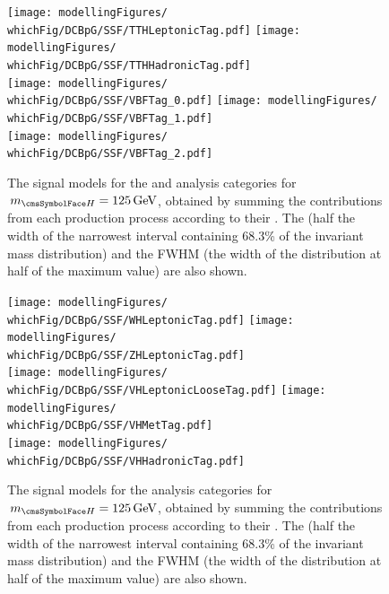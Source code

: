 \begin{figure}[htp!]
\centering
\texttt{[image: modellingFigures/\\whichFig/DCBpG/SSF/TTHLeptonicTag.pdf]} 
\texttt{[image: modellingFigures/\\whichFig/DCBpG/SSF/TTHHadronicTag.pdf]} \\
\texttt{[image: modellingFigures/\\whichFig/DCBpG/SSF/VBFTag\_0.pdf]} 
\texttt{[image: modellingFigures/\\whichFig/DCBpG/SSF/VBFTag\_1.pdf]}\\ 
\ifNewAnalysis
\texttt{[image: modellingFigures/\\whichFig/DCBpG/SSF/VBFTag\_2.pdf]} 
\fi
\caption{The signal models for the \VBFTag and \TTHTag analysis categories for $\mH=125\GeV$, obtained by summing the contributions from each production process according to their \effxacc. The \effSigma (half the width of the narrowest interval containing 68.3\% of the invariant mass distribution) and the FWHM (the width of the distribution at half of the maximum value) are also shown.}

\label{fig:model:sig_model_per_category_bis}
\end{figure}

\ifNewAnalysis
\begin{figure}[htp!]
\centering
\texttt{[image: modellingFigures/\\whichFig/DCBpG/SSF/WHLeptonicTag.pdf]} 
\texttt{[image: modellingFigures/\\whichFig/DCBpG/SSF/ZHLeptonicTag.pdf]} \\
\texttt{[image: modellingFigures/\\whichFig/DCBpG/SSF/VHLeptonicLooseTag.pdf]} 
\texttt{[image: modellingFigures/\\whichFig/DCBpG/SSF/VHMetTag.pdf]} \\
\texttt{[image: modellingFigures/\\whichFig/DCBpG/SSF/VHHadronicTag.pdf]} 

\caption{The signal models for the \VHTag analysis categories for $\mH=125\GeV$, obtained by summing the contributions from each production process according to their \effxacc. The \effSigma (half the width of the narrowest interval containing 68.3\% of the invariant mass distribution) and the FWHM (the width of the distribution at half of the maximum value) are also shown.}

\label{fig:model:sig_model_per_category_tris}
\end{figure}
\fi

